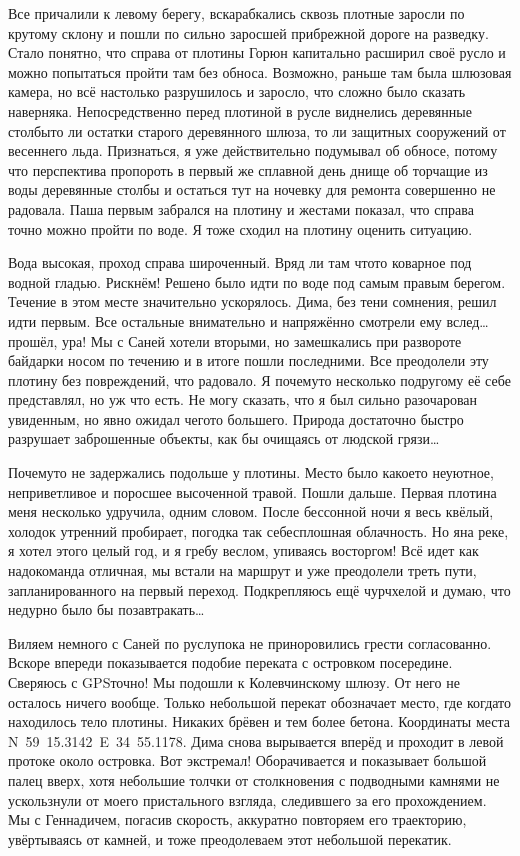 Все причалили к левому берегу, вскарабкались сквозь плотные заросли по крутому склону и пошли по сильно заросшей прибрежной дороге на разведку. Стало понятно, что справа от плотины Горюн капитально расширил своё русло и можно попытаться пройти там без обноса. Возможно, раньше там была шлюзовая камера, но всё настолько разрушилось и заросло, что сложно было сказать наверняка. Непосредственно перед плотиной в русле виднелись деревянные столбы\mdash то ли остатки старого деревянного шлюза, то ли защитных сооружений от весеннего льда. Признаться, я уже действительно подумывал об обносе, потому что перспектива пропороть в первый же сплавной день днище об торчащие из воды деревянные столбы и остаться тут на ночевку для ремонта совершенно не радовала. Паша первым забрался на плотину и жестами показал, что справа точно можно пройти по воде. Я тоже сходил на плотину оценить ситуацию. 

Вода высокая, проход справа широченный. Вряд ли там что\sdash то коварное под водной гладью. Рискнём! Решено было идти по воде под самым правым берегом. Течение в этом месте значительно ускорялось. Дима, без тени сомнения, решил идти первым. Все остальные внимательно и напряжённо смотрели ему вслед\ldots прошёл, ура! Мы с Саней хотели вторыми, но замешкались при развороте байдарки носом по течению и в итоге пошли последними. Все преодолели эту плотину без повреждений, что радовало. Я почему\sdash то несколько по\sdash другому её себе представлял, но уж что есть. Не могу сказать, что я был сильно разочарован увиденным, но явно ожидал чего\sdash то большего. Природа достаточно быстро разрушает заброшенные объекты, как бы очищаясь от людской грязи\ldots

Почему\sdash то не задержались подольше у плотины. Место было какое\sdash то неуютное, неприветливое и поросшее высоченной травой. Пошли дальше. Первая плотина меня несколько удручила, одним словом. После бессонной ночи я весь квёлый, холодок утренний пробирает, погодка так себе\mdash сплошная облачность. Но я\mdash на реке, я хотел этого целый год, и я гребу веслом, упиваясь восторгом! Всё идет как надо\mdash команда отличная, мы встали на маршрут и уже преодолели треть пути, запланированного на первый переход. Подкрепляюсь ещё чурчхелой и думаю, что недурно было бы позавтракать\ldots 

Виляем немного с Саней по руслу\mdash пока не приноровились грести согласованно. Вскоре впереди показывается подобие переката с островком посередине. Сверяюсь с GPS\mdash точно! Мы подошли к Колевчинскому шлюзу. От него не осталось ничего вообще. Только небольшой перекат обозначает место, где когда\sdash то находилось тело плотины. Никаких брёвен и тем более бетона. Координаты места N~59\degree~15.3142\textprime~E~34\degree~55.1178\textprime. Дима снова вырывается вперёд и проходит в левой протоке около островка. Вот экстремал! Оборачивается и показывает большой палец вверх, хотя небольшие толчки от столкновения с подводными камнями не ускользнули от моего пристального взгляда, следившего за его прохождением. Мы с Геннадичем, погасив скорость, аккуратно повторяем его траекторию, увёртываясь от камней, и тоже преодолеваем этот небольшой перекатик. 

